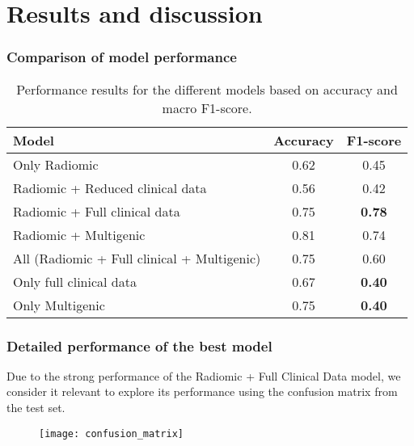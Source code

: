 \section{Results and discussion}


\begin{frame}
    \frametitle{Comparison of model performance}
    \vspace{3mm}

\begin{table}
        \centering
        \captionsetup{justification=centerlast}  %
        \begin{tabular}{lcc}
        \hline
        \textbf{Model} & \textbf{Accuracy} & \textbf{F1-score} \\
        \hline
        Only Radiomic & 0.62 & 0.45 \\
        Radiomic + Reduced clinical data & 0.56 & 0.42 \\
        Radiomic + Full clinical data & 0.75 & \cellcolor{green!25} \textbf{0.78} \\  %
        Radiomic + Multigenic & 0.81 & 0.74 \\
        All (Radiomic + Full clinical + Multigenic) & 0.75 & 0.60 \\
        Only full clinical data & 0.67 & \cellcolor{red!25} \textbf{0.40} \\
        Only Multigenic & 0.75 & \cellcolor{red!25} \textbf{0.40} \\  %
        \hline
        \end{tabular}
        \vspace{3mm}
        \caption{Performance results for the different models based on accuracy and macro F1-score.}
        \label{tab:model_performance}
    \end{table}

    \vfill 
\end{frame}


\begin{frame}
    \frametitle{Detailed performance of the best model}
    \vspace{3mm}

    Due to the strong performance of the Radiomic + Full Clinical Data model, we consider it relevant to explore its performance using the confusion matrix from the test set.

    \vspace{1mm}

    \begin{figure}
        \centering
        \texttt{[image: confusion\_matrix]}
        \label{fig:confusion_matrix}
    \end{figure}

    \vfill 
\end{frame}